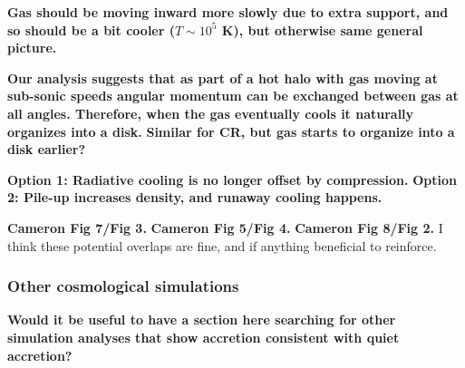 \documentclass[fleqn,usenatbib]{mnras}
\begin{document}
\textbf{Gas should be moving inward more slowly due to extra support, and so should be a bit cooler ($T\sim 10^5$ K), but otherwise same general picture.}

\textbf{
Our analysis suggests that as part of a hot halo with gas moving at sub-sonic speeds angular momentum can be exchanged between gas at all angles.
Therefore, when the gas eventually cools it naturally organizes into a disk.
}
\textbf{
Similar for CR, but gas starts to organize into a disk earlier?
}

\textbf{Option 1: Radiative cooling is no longer offset by compression.}
\textbf{Option 2: Pile-up increases density, and runaway cooling happens.}

\textbf{Cameron Fig 7/Fig 3.}
\textbf{Cameron Fig 5/Fig 4.}
\textbf{Cameron Fig 8/Fig 2.}
I think these potential overlaps are fine, and if anything beneficial to reinforce.

\subsubsection{Other cosmological simulations}

\textbf{
Would it be useful to have a section here searching for other simulation analyses that show accretion consistent with quiet accretion?
}

\end{document}
